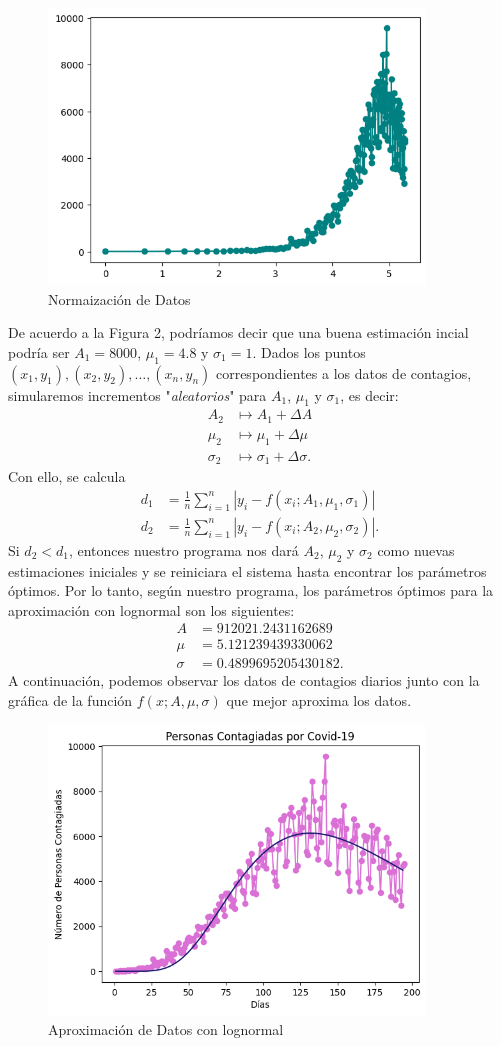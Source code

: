 \documentclass{article}
\theoremstyle{definition}
\begin{document}
\begin{figure}[htp]
    \centering
    \includegraphics[width=10cm]{datos_norm.png}
    \caption{Normaizaci\'on de Datos}
    \label{fig:datosnorm}
\end{figure}
De acuerdo a la Figura 2, podr\'iamos decir que una buena estimaci\'on incial podr\'ia ser $A_1=8000$, $\mu_1=4.8$ y $\sigma_1=1$. Dados los puntos $(x_1,y_1),(x_2,y_2),\dots,(x_n,y_n)$ correspondientes a los datos de contagios, simularemos incrementos "\textit{aleatorios}" para $A_1$, $\mu_1$ y $\sigma_1$, es decir:
\begin{align*}
    A_2&\mapsto A_1+\Delta A\\
    \mu_2&\mapsto \mu_1+\Delta\mu\\
    \sigma_2&\mapsto \sigma_1+\Delta\sigma.
\end{align*}
Con ello, se calcula
\begin{align*}
    d_1&=\frac{1}{n}\sum_{i=1}^{n}|y_i-f\left(x_i;A_1,\mu_1,\sigma_1\right)|\\
    d_2&=\frac{1}{n}\sum_{i=1}^{n}|y_i-f\left(x_i;A_2,\mu_2,\sigma_2\right)|.
\end{align*}
Si $d_2<d_1$, entonces nuestro programa nos dar\'a $A_2$, $\mu_2$ y $\sigma_2$ como nuevas estimaciones iniciales y se reiniciara el sistema hasta encontrar los par\'ametros \'optimos. Por lo tanto, seg\'un nuestro programa, los par\'ametros \'optimos para la aproximaci\'on con lognormal son los siguientes:
\begin{align*}
    A&=912021.2431162689\\
    \mu&=5.121239439330062\\
    \sigma&=0.4899695205430182.
\end{align*}
A continuaci\'on, podemos observar los datos de contagios diarios junto con la gr\'afica de la funci\'on $f(x;A,\mu,\sigma)$ que mejor aproxima los datos.
\begin{figure}[htp]
    \centering
    \includegraphics[width=10cm]{covid_y_logn.png}
    \caption{Aproximaci\'on de Datos con lognormal}
    \label{fig:covidlogn}
\end{figure}
\end{document}
